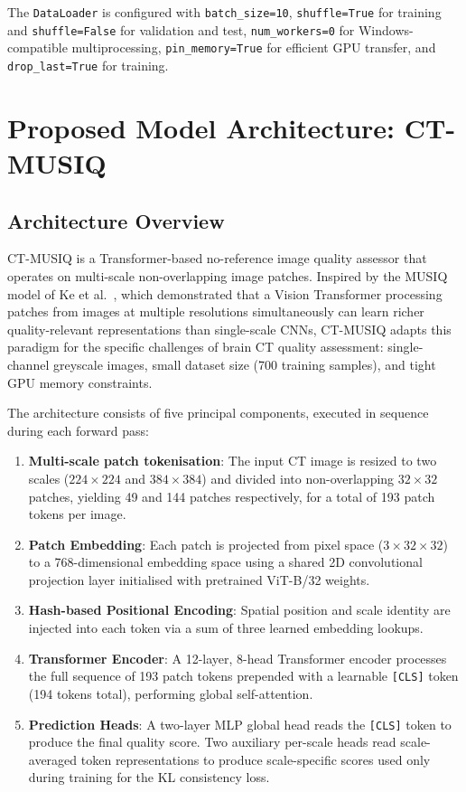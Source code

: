 The \texttt{DataLoader} is configured with \texttt{batch\_size=10},
\texttt{shuffle=True} for training and \texttt{shuffle=False} for validation and test,
\texttt{num\_workers=0} for Windows-compatible multiprocessing, \texttt{pin\_memory=True}
for efficient GPU transfer, and \texttt{drop\_last=True} for training.


\section{Proposed Model Architecture: CT-MUSIQ}
\label{sec:architecture}

\subsection{Architecture Overview}

CT-MUSIQ is a Transformer-based no-reference image quality assessor that operates on
multi-scale non-overlapping image patches. Inspired by the MUSIQ model of Ke et al.\
\cite{ke2021musiq}, which demonstrated that a Vision Transformer processing patches
from images at multiple resolutions simultaneously can learn richer quality-relevant
representations than single-scale CNNs, CT-MUSIQ adapts this paradigm for the specific
challenges of brain CT quality assessment: single-channel greyscale images, small
dataset size (700 training samples), and tight GPU memory constraints.

The architecture consists of five principal components, executed in sequence during each
forward pass:

\begin{enumerate}
    \item \textbf{Multi-scale patch tokenisation}: The input CT image is resized to
          two scales ($224 \times 224$ and $384 \times 384$) and divided into
          non-overlapping $32 \times 32$ patches, yielding 49 and 144 patches
          respectively, for a total of 193 patch tokens per image.
    \item \textbf{Patch Embedding}: Each patch is projected from pixel space
          ($3 \times 32 \times 32$) to a 768-dimensional embedding space using a shared
          2D convolutional projection layer initialised with pretrained ViT-B/32 weights.
    \item \textbf{Hash-based Positional Encoding}: Spatial position and scale identity
          are injected into each token via a sum of three learned embedding lookups.
    \item \textbf{Transformer Encoder}: A 12-layer, 8-head Transformer encoder
          processes the full sequence of 193 patch tokens prepended with a learnable
          \texttt{[CLS]} token (194 tokens total), performing global self-attention.
    \item \textbf{Prediction Heads}: A two-layer MLP global head reads the
          \texttt{[CLS]} token to produce the final quality score. Two auxiliary
          per-scale heads read scale-averaged token representations to produce
          scale-specific scores used only during training for the KL consistency loss.
\end{enumerate}

